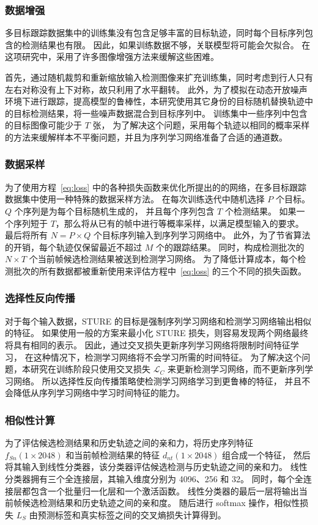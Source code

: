 \subsubsection{数据增强}
多目标跟踪数据集中的训练集没有包含足够丰富的目标轨迹，同时每个目标序列包含的检测结果也有限。
因此，如果训练数据不够，关联模型将可能会欠拟合。
在这项研究中，采用了许多图像增强方法来缓解这些困难。

首先，通过随机裁剪和重新缩放输入检测图像来扩充训练集，同时考虑到行人只有左右对称没有上下对称，故只利用了水平翻转。
此外，为了模拟在动态开放噪声环境下进行跟踪，提高模型的鲁棒性，本研究使用其它身份的目标随机替换轨迹中的目标检测结果，将一些噪声数据混合到目标序列中。
训练集中一些序列中包含的目标图像可能少于 $ T $ 张，
为了解决这个问题，采用每个轨迹以相同的概率采样的方法来缓解样本不平衡问题，并且为序列学习网络准备了合适的通道数。


\subsubsection{数据采样} \label{sec:sampling}
为了使用方程~\ref{eq:loss} 中的各种损失函数来优化所提出的的网络，在多目标跟踪数据集中使用一种特殊的数据采样方法。
在每次训练迭代中随机选择 $P$ 个目标。
$Q$ 个序列是为每个目标随机生成的，
并且每个序列包含 $T$ 个检测结果。
如果一个序列短于 $T$，那么将从已有的帧中进行等概率采样，以满足模型输入的要求。
最后将所有 $N=P\times Q$ 个目标序列输入到序列学习网络中。
此外，为了节省算法的开销，每个轨迹仅保留最近不超过 $M$ 个的跟踪结果。
同时，构成检测批次的 $N\times T$ 个当前帧候选检测结果被送到检测学习网络。
为了降低计算成本，每个检测批次的所有数据都被重新使用来评估方程中~\ref{eq:loss} 的三个不同的损失函数。


\subsubsection{选择性反向传播}
对于每个输入数据，STURE 的目标是强制序列学习网络和检测学习网络输出相似的特征。
如果使用一般的方案来最小化 STURE 损失，则容易发现两个网络最终将具有相同的表示。
因此，通过交叉损失更新序列学习网络将限制时间特征学习，
在这种情况下，检测学习网络将不会学习所需的时间特征。
为了解决这个问题，本研究在训练阶段只使用交叉损失 $\mathcal{L}_{C}$ 来更新检测学习网络，而不更新序列学习网络。
所以选择性反向传播策略使检测学习网络学习到更鲁棒的特征，
并且不会降低从序列学习网络中学习时间特征的能力。


\subsubsection{相似性计算}
为了评估候选检测结果和历史轨迹之间的亲和力，将历史序列特征 $f_{Sn} (1 \times 2048)$ 和当前帧检测结果的特征 $d_{nt} (1 \times 2048)$ 组合成一个特征，
然后将其输入到线性分类器，该分类器评估候选检测与历史轨迹之间的亲和力。
线性分类器拥有三个全连接层，其输入维度分别为 4096、256 和 32。
同时，每个全连接层都包含一个批量归一化层和一个激活函数。
线性分类器的最后一层将输出当前帧候选检测结果和历史轨迹之间的亲和度。
随后进行 softmax 操作，相似性损失 $L_S$ 由预测标签和真实标签之间的交叉熵损失计算得到。

